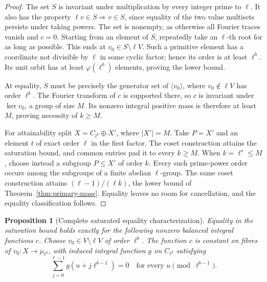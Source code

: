 \documentclass[11pt]{article}
\newtheorem{proposition}[theorem]{Proposition}
\theoremstyle{definition}
\theoremstyle{remark}
\begin{document}
\begin{proof}
The set $S$ is invariant under multiplication by every integer prime to
$\ell$.  It also has the property $\ell v\in S\Rightarrow v\in S$,
since equality of the two value multisets persists under taking powers.
The set is nonempty, as otherwise all Fourier traces vanish and $c=0$.
Starting from an element of $S$, repeatedly take an $\ell$-th root for
as long as possible.  This ends at $v_0\in S\setminus\ell V$.  Such a
primitive element has a coordinate not divisible by $\ell$ in some
cyclic factor; hence its order is at least $\ell^b$.  Its unit orbit
has at least $\varphi(\ell^b)$ elements, proving the lower bound.

At equality, $S$ must be precisely the generator set of
$\langle v_0\rangle$, where $v_0\notin\ell V$ has order $\ell^b$.
The Fourier transform of $c$ is supported there, so $c$ is invariant
under $\ker v_0$, a group of size $M$.  Its nonzero integral positive
mass is therefore at least $M$, proving necessity of $k\ge M$.

For attainability split $X=C_{\ell^b}\oplus X'$, where $|X'|=M$.
Take $P=X'$ and an element $t$ of exact order $\ell$ in the first factor.
The coset construction attains the saturation bound, and common
entries pad it to every $k\ge M$.  When $k=\ell^s\le M$, choose instead
a subgroup $P\le X'$ of order $k$.  Every such prime-power order occurs
among the subgroups of a finite abelian $\ell$-group.  The same coset
construction attains $(\ell-1)/(\ell k)$, the lower bound of
Theorem~\ref{thm:primary-mass}.  Equality leaves no room for cancellation,
and the equality classification follows.
\end{proof}

\begin{proposition}[Complete saturated equality characterization]
\label{prop:primary-saturated-equality}
Equality in the saturation bound holds exactly for the following
nonzero balanced integral functions $c$.  Choose
$v_0\in V\setminus\ell V$ of order $\ell^b$.  The function $c$ is
constant on fibres of $v_0:X\to\mu_{\ell^b}$, with induced integral
function $g$ on $C_{\ell^b}$ satisfying
\[
 \sum_{j=0}^{\ell-1}g(u+j\ell^{b-1})=0
 \quad\text{for every }u\pmod{\ell^{b-1}}.
\]
\end{proposition}
\end{document}

